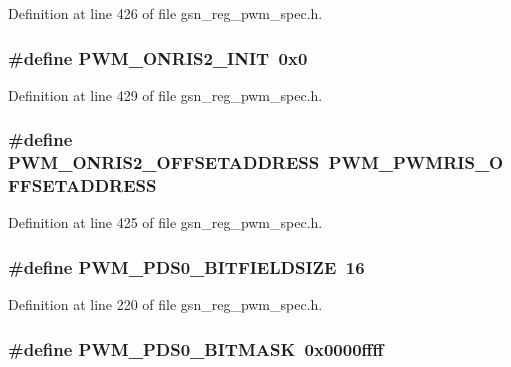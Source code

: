 Definition at line 426 of file gsn\_\-reg\_\-pwm\_\-spec.h.

\hypertarget{a00565_ac51a141dd577d19955defa945ba8c71c}{
\subsubsection[{PWM\_\-ONRIS2\_\-INIT}]{\setlength{\rightskip}{0pt plus 5cm}\#define PWM\_\-ONRIS2\_\-INIT~0x0}}
\label{a00565_ac51a141dd577d19955defa945ba8c71c}


Definition at line 429 of file gsn\_\-reg\_\-pwm\_\-spec.h.

\hypertarget{a00565_a9c251436a956778616254b424b9d9476}{
\subsubsection[{PWM\_\-ONRIS2\_\-OFFSETADDRESS}]{\setlength{\rightskip}{0pt plus 5cm}\#define PWM\_\-ONRIS2\_\-OFFSETADDRESS~PWM\_\-PWMRIS\_\-OFFSETADDRESS}}
\label{a00565_a9c251436a956778616254b424b9d9476}


Definition at line 425 of file gsn\_\-reg\_\-pwm\_\-spec.h.

\hypertarget{a00565_a36fe636cc40d9d2be64b0b2e23ee08d3}{
\subsubsection[{PWM\_\-PDS0\_\-BITFIELDSIZE}]{\setlength{\rightskip}{0pt plus 5cm}\#define PWM\_\-PDS0\_\-BITFIELDSIZE~16}}
\label{a00565_a36fe636cc40d9d2be64b0b2e23ee08d3}


Definition at line 220 of file gsn\_\-reg\_\-pwm\_\-spec.h.

\hypertarget{a00565_a60c76844001c700b5dfa3162b04d7b9d}{
\subsubsection[{PWM\_\-PDS0\_\-BITMASK}]{\setlength{\rightskip}{0pt plus 5cm}\#define PWM\_\-PDS0\_\-BITMASK~0x0000ffff}}
\label{a00565_a60c76844001c700b5dfa3162b04d7b9d}


